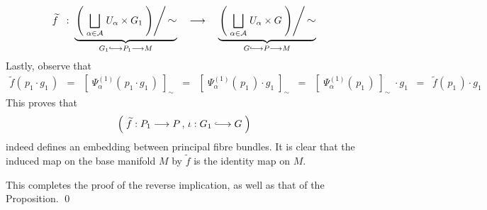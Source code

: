 \begin{equation*}
\widetilde{f} \;\; : \;
	\underset{G_{1} \longhookrightarrow P_{1} \longrightarrow M}
	{\underbrace{\left.\left(\;\underset{\alpha\in\mathcal{A}}{\bigsqcup}\;U_{\alpha} \times G_{1}\;\right)\right\slash\textnormal{\large$\sim$}}}
\quad \longrightarrow \quad
	\underset{G \longhookrightarrow P \longrightarrow M}
	{\underbrace{\left.\left(\;\underset{\alpha\in\mathcal{A}}{\bigsqcup}\;U_{\alpha} \times G\;\right)\right\slash\textnormal{\large$\sim$}}}
\end{equation*}
Lastly, observe that
\begin{eqnarray*}
\widetilde{f}(\,p_{1} \cdot g_{1}\,)
& = &
	\left[\;\Psi_{\alpha}^{(1)}\!\left(\,p_{1} \cdot g_{1}\,\right)\;\right]_{\sim}
\;\; = \;\;
	\left[\;\Psi_{\alpha}^{(1)}\!\left(\,p_{1}\,\right)\cdot g_{1}\;\right]_{\sim}
\;\; = \;\;
	\left[\;\Psi_{\alpha}^{(1)}\!\left(\,p_{1}\,\right)\;\right]_{\sim}\;\cdot g_{1}
\;\; = \;\;
	\widetilde{f}(\,p_{1}\,) \cdot g_{1}
\end{eqnarray*}
This proves that
\begin{equation*}
\left(\;\widetilde{f} : P_{1} \longrightarrow P \,,\, \iota : G_{1} \longhookrightarrow G \;\right)
\end{equation*}
indeed defines an embedding between principal fibre bundles.
It is clear that the induced map on the base manifold $M$ by $\widetilde{f}$ is the identity map on $M$.

\vskip 0.5cm
\noindent
This completes the proof of the reverse implication, as well as that of the Proposition.
\qed


